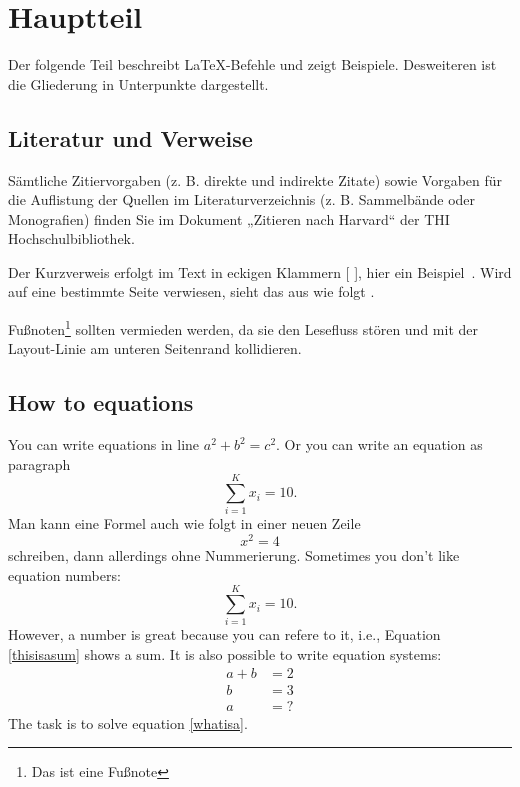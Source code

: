 \section{Hauptteil} %

Der folgende Teil beschreibt \LaTeX-Befehle und zeigt Beispiele. Desweiteren ist die Gliederung in Unterpunkte dargestellt.

\subsection{Literatur und Verweise} %

Sämtliche Zitiervorgaben (z. B. direkte und indirekte Zitate) sowie Vorgaben für die Auflistung der Quellen im Literaturverzeichnis (z. B. Sammelbände oder Monografien) finden Sie im Dokument „Zitieren nach Harvard“ der THI Hochschulbibliothek.

Der Kurzverweis erfolgt im Text in eckigen Klammern [ ], hier ein Beispiel~\cite{Dreamer2025a}. Wird auf eine bestimmte Seite verwiesen, sieht das aus wie folgt \cite[S. 225]{Dreamer2025a}.

Fußnoten\footnote{Das ist eine Fußnote} sollten vermieden werden, da sie den Lesefluss stören und mit der Layout-Linie am unteren Seitenrand kollidieren. 



\subsection{How to equations} %
You can write equations in line ${a^2 + b^2 = c^2}$. Or you can write an equation as paragraph
\begin{equation}
    \label{thisisasum}
    \sum_{i=1}^K x_i = 10.
\end{equation}
Man kann eine Formel auch wie folgt in einer neuen Zeile \[x^2=4\] schreiben, dann allerdings ohne Nummerierung. 
Sometimes you don't like equation numbers:
\begin{equation*}
    \sum_{i=1}^{K} x_i = 10.
\end{equation*}
However, a number is great because you can refere to it, i.e., Equation \eqref{thisisasum} shows a sum.
It is also possible to write equation systems:
\begin{align}
    a + b & = 2 \\
    b & = 3 \\
    a &=?\label{whatisa}
\end{align}
The task is to solve equation \eqref{whatisa}.

